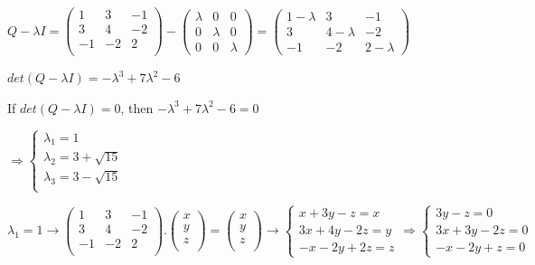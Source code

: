 \documentclass[fleqn]{article}
\begin{document}
\begin{enumerate}
      \textcolor{hwColor}{
        $
          Q-\lambda I= \begin{pmatrix}
            1 & 3 & -1 \\
            3 & 4 & -2 \\
            -1 & -2 & 2 \\
          \end{pmatrix}-\begin{pmatrix}
            \lambda & 0 & 0 \\
            0 & \lambda & 0 \\
            0 & 0 & \lambda
          \end{pmatrix}=\begin{pmatrix}
            1-\lambda & 3 & -1 \\
            3 & 4-\lambda & -2 \\
            -1 & -2 & 2-\lambda
          \end{pmatrix}
        $
      }

      \textcolor{hwColor}{
        $det(Q-\lambda I)=-\lambda^3+7\lambda^2-6$
      }

      \textcolor{hwColor}{
        If $det(Q-\lambda I)=0$, then $-\lambda^3+7\lambda^2-6=0$
      }

      \textcolor{hwColor}{
        $
        \Longrightarrow 
        \begin{cases}
          \lambda_1=1 \\
          \lambda_2=3+\sqrt{15} \\
          \lambda_3=3-\sqrt{15} \\
        \end{cases}
        $
      }

      \textcolor{hwColor}{
        $
        \lambda_1=1 \rightarrow
        \begin{pmatrix}
          1 & 3 & -1 \\
          3 & 4 & -2 \\
          -1 & -2 & 2 \\
        \end{pmatrix}.\begin{pmatrix}
          x \\
          y \\
          z \\
        \end{pmatrix}=\begin{pmatrix}
          x \\
          y \\
          z \\
        \end{pmatrix}
        \rightarrow
        \begin{cases}
          x+3y-z=x \\
          3x+4y-2z=y \\
          -x-2y+2z=z
        \end{cases}
        \Longrightarrow
        \begin{cases}
         3y-z=0  \\
         3x+3y-2z=0  \\
         -x-2y+z=0 
        \end{cases}
        $
      }


\end{enumerate}
\end{document}

